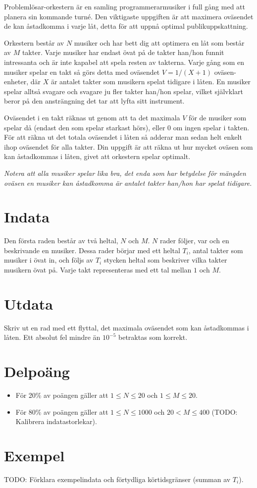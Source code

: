 
Problemlösar-orkestern är en samling programmerarmusiker i full gång med att planera sin kommande turné. Den viktigaste uppgiften är att maximera oväsendet de kan åstadkomma i varje låt, detta för att uppnå optimal publikuppskattning.

Orkestern består av $N$ musiker och har bett dig att optimera en låt som består av $M$ takter. Varje musiker har endast övat på de takter han/hon funnit intressanta och är inte kapabel att spela resten av takterna. Varje gång som en musiker spelar en takt så görs detta med oväsendet $V=1/(X+1)$ oväsen-enheter, där $X$ är antalet takter som musikern spelat tidigare i låten. En musiker spelar alltså svagare och svagare ju fler takter han/hon spelar, vilket självklart beror på den ansträngning det tar att lyfta sitt instrument.

Oväsendet i en takt räknas ut genom att ta det maximala $V$ för de musiker som spelar då (endast den som spelar starkast hörs), eller $0$ om ingen spelar i takten. För att räkna ut det totala oväsendet i låten så adderar man sedan helt enkelt ihop oväsendet för alla takter. Din uppgift är att räkna ut hur mycket oväsen som kan åstadkommas i låten, givet att orkestern spelar optimalt.

\emph{Notera att alla musiker spelar lika bra, det enda som har betydelse för mängden oväsen en musiker kan åstadkomma är antalet takter han/hon har spelat tidigare.}

\section*{Indata}
Den första raden består av två heltal, $N$ och $M$. $N$ rader följer, var och en beskrivande en musiker. Dessa rader börjar med ett heltal $T_i$, antal takter som musiker i övat in, och följs av $T_i$ stycken heltal som beskriver vilka takter musikern övat på. Varje takt representeras med ett tal mellan $1$ och $M$.

\section*{Utdata}
Skriv ut en rad med ett flyttal, det maximala oväsendet som kan åstadkommas i låten. Ett absolut fel mindre än $10^{-5}$ betraktas som korrekt.

\section*{Delpoäng}
\begin{itemize}
\item För 20\% av poängen gäller att $1 \leq N \leq 20$ och $1 \leq M \leq 20$.
\item För 80\% av poängen gäller att $1 \leq N \leq 1000$ och $20 < M \leq 400$ (TODO: Kalibrera indatastorlekar).
\end{itemize}

\section*{Exempel}
TODO: Förklara exempelindata och förtydliga körtidsgränser (summan av $T_i$).
